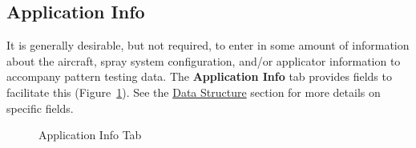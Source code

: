\documentclass[10pt,letterpaper,titlepage]{article}
\begin{document}
    \subsection{Application Info}
    It is generally desirable, but not required, to enter in some amount of information about the aircraft, spray system configuration, and/or applicator information to accompany pattern testing data. The \textbf{Application Info} tab provides fields to facilitate this (Figure~\ref{fig:application_info}). See the \hyperref[sec:data]{Data Structure} section for more details on specific fields.
    \begin{figure}[hb]
        \centering
        \caption{Application Info Tab}
        \label{fig:application_info}
    \end{figure}
    \FloatBarrier
\end{document}
